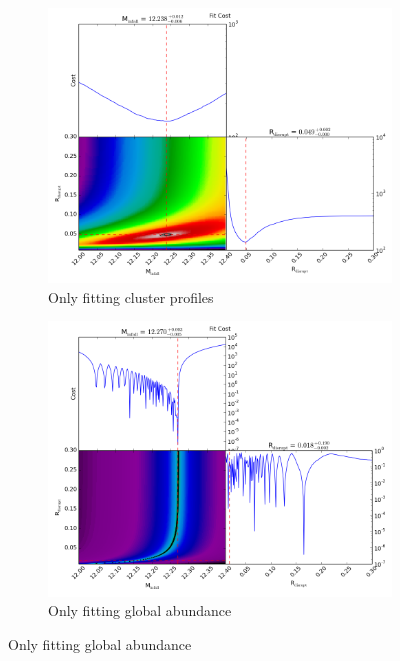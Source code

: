 \documentclass[twocolumn]{article}
\begin{document}
\begin{figure}
  \begin{subfigure}{.5\textwidth}
    \centering\includegraphics[width=1.0\linewidth]{figs/cfn/simet/simet_rd.param/calc_likelihood_bounds.py/fig2.png}
    \caption{Only fitting cluster profiles}
  \end{subfigure}
  \begin{subfigure}{.5\textwidth}
    \centering\includegraphics[width=1.0\linewidth]{figs/cfn/simet/simet_rd_abundance_only.param/calc_likelihood_bounds.py/fig2.png}
    \caption{Only fitting global abundance}
  \end{subfigure}

\end{figure}
\end{document}
